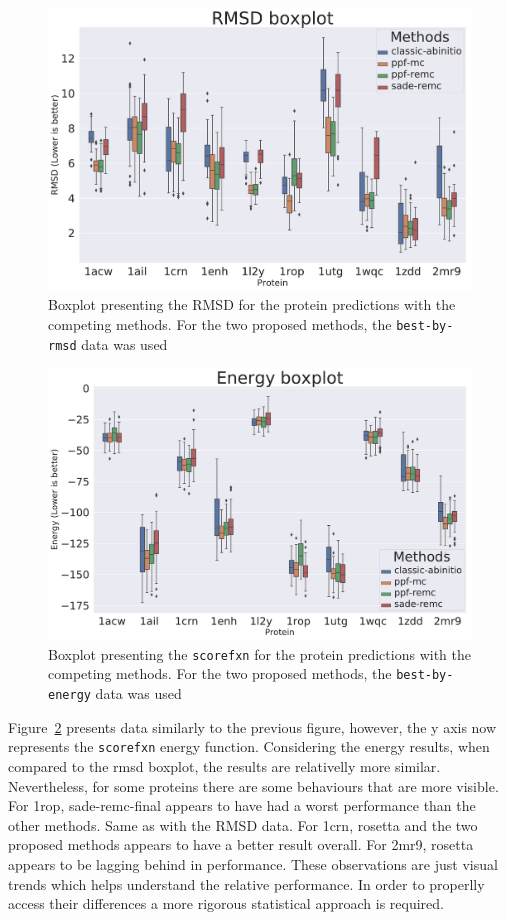 \begin{figure}
  \includegraphics[width=\linewidth]{Figuras/boxplots/boxplot_best_by_rmsd_rmsd_after.pdf}
  \caption{Boxplot presenting the RMSD for the protein predictions with the
    competing methods. For the two proposed methods, the \texttt{best-by-rmsd}
    data was used}
  \label{fig:boxplot-rmsd}
\end{figure}

\begin{figure}
  \includegraphics[width=\linewidth]{Figuras/boxplots/boxplot_best_by_energy_scorefxn.pdf}
  \caption{Boxplot presenting the \texttt{scorefxn} for the protein predictions with the
    competing methods. For the two proposed methods, the \texttt{best-by-energy}
    data was used}
  \label{fig:boxplot-energy}
\end{figure}

Figure~\ref{fig:boxplot-energy} presents data similarly to the previous figure,
however, the y axis now represents the \texttt{scorefxn} energy function. Considering
the energy results, when compared to the rmsd boxplot, the results are relativelly
more similar. Nevertheless, for some proteins there are some behaviours that are
more visible. For 1rop, sade-remc-final appears to have had a worst performance
than the other methods. Same as with the RMSD data. For 1crn, rosetta and the two
proposed methods appears to have a better result overall. For 2mr9, rosetta
appears to be lagging behind in performance. These observations are just visual
trends which helps understand the relative performance. In order to properlly
access their differences a more rigorous statistical approach is required.

